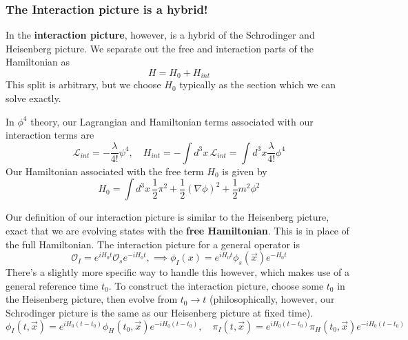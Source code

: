 \subsubsection{The Interaction picture is a hybrid!} 
In the \textbf{interaction picture}, however, is a hybrid of the Schrodinger and Heisenberg 
picture. We separate out the free and interaction parts of the Hamiltonian as 
\[
H = H_0 + H_{ int }
\] This split is arbitrary, but we choose $ H_0 $ typically as the section which we can solve exactly. 
\begin{example}
In $ \phi ^ 4 $ theory, our Lagrangian and Hamiltonian terms associated with our interaction terms are
\[
\mathcal{ L }_{ int   }  = - \frac{\lambda}{ 4 ! }\psi ^ 4 , \quad   H_{ int }  =- \int d^ 3 x \, \mathcal{ L }_{int} = \int d^ 3 x \frac{\lambda}{4 ! } \phi^ 4 
\] Our Hamiltonian associated with the free term $ H_0 $
is given by 
\[
H_0 = \int d^ 3 x \, \frac{1}{2 } \pi ^2 + \frac{1}{2 } ( \nabla \phi) ^ 2 + \frac{1}{2 } m^ 2 \phi^ 2 
\]  
\end{example}
Our definition of our interaction picture is similar to the Heisenberg picture, exact that we are evolving states with the \textbf{free Hamiltonian}. 
This is in place of the full Hamiltonian.  
The interaction picture for a general operator is 
\[
\mathcal{ O }_ I = e^{ i H_0 t } \mathcal{ O }_s  e^{ - i H_0 t }, \implies \phi_ I ( x)  = e^{ i H_0 t } \phi_s( \vec{x} ) e^{ - H_0 t } 
\]  There's a slightly more specific way to handle this however, 
which makes use of a general reference time $ t_0 $. 
To construct the interaction picture, choose some $ t_0 $ in 
the Heisenberg picture, then evolve from $ t_0 \to t $ (philosophically, 
however, our Schrodinger picture is the same as our Heisenberg picture at 
fixed time).
\[
\phi_I( t, \vec{x} ) = e^{ i H_0 (  t- t_0 ) }\phi_H ( t_0 , \vec{x} ) e^{  - i H_0  ( t - t_0 ) }, \quad \pi_I ( t, \vec{x} ) = e^{ i H_0 ( t - t_0 ) } \pi_H ( t_0 , \vec{x} ) e^{  - i H_0 ( t -t_0 ) }
\]

